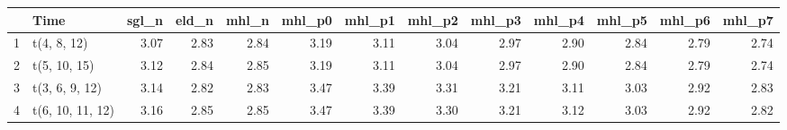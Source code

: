 \begin{table}[ht]
\centering
\begin{tabular}{rlrrrrrrrrrrr}
  \hline
 & Time & sgl\_n & eld\_n & mhl\_n & mhl\_p0 & mhl\_p1 & mhl\_p2 & mhl\_p3 & mhl\_p4 & mhl\_p5 & mhl\_p6 & mhl\_p7 \\ 
  \hline
  1 & t(4, 8, 12) & 3.07 & 2.83 & 2.84 & 3.19 & 3.11 & 3.04 & 2.97 & 2.90 & 2.84 & 2.79 & 2.74 \\ 
  2 & t(5, 10, 15) & 3.12 & 2.84 & 2.85 & 3.19 & 3.11 & 3.04 & 2.97 & 2.90 & 2.84 & 2.79 & 2.74 \\ 
  3 & t(3, 6, 9, 12) & 3.14 & 2.82 & 2.83 & 3.47 & 3.39 & 3.31 & 3.21 & 3.11 & 3.03 & 2.92 & 2.83 \\ 
  4 & t(6, 10, 11, 12) & 3.16 & 2.85 & 2.85 & 3.47 & 3.39 & 3.30 & 3.21 & 3.12 & 3.03 & 2.92 & 2.82 \\ 
   \hline
\end{tabular}
\end{table}
